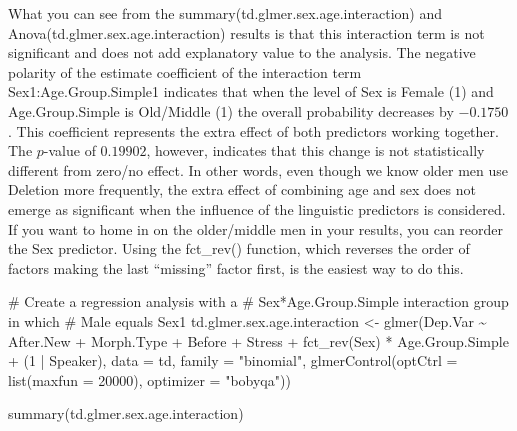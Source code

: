 \documentclass[
  10pt,
  letterpaper]{article}
\newenvironment{Shaded}{\begin{snugshade}}{\end{snugshade}}
\newcommand{\AttributeTok}[1]{\textcolor[rgb]{0.40,0.45,0.13}{#1}}
\newcommand{\CommentTok}[1]{\textcolor[rgb]{0.37,0.37,0.37}{#1}}
\newcommand{\DecValTok}[1]{\textcolor[rgb]{0.68,0.00,0.00}{#1}}
\newcommand{\FunctionTok}[1]{\textcolor[rgb]{0.28,0.35,0.67}{#1}}
\newcommand{\NormalTok}[1]{\textcolor[rgb]{0.00,0.23,0.31}{#1}}
\newcommand{\OtherTok}[1]{\textcolor[rgb]{0.00,0.23,0.31}{#1}}
\newcommand{\SpecialCharTok}[1]{\textcolor[rgb]{0.37,0.37,0.37}{#1}}
\newcommand{\StringTok}[1]{\textcolor[rgb]{0.13,0.47,0.30}{#1}}
\renewcommand\texttt[1]{{\ttfamily\color{BrickRed}#1}}
\begin{document}
What you can see from the \texttt{summary(td.glmer.sex.age.interaction)}
and \texttt{Anova(td.glmer.sex.age.interaction)} results is that this
interaction term is not significant and does not add explanatory value
to the analysis. The negative polarity of the estimate coefficient of
the interaction term \texttt{Sex1:Age.Group.Simple1} indicates that when
the level of \texttt{Sex} is \texttt{Female} (\texttt{1}) and
\texttt{Age.Group.Simple} is \texttt{Old/Middle} (\texttt{1}) the
overall probability decreases by \(-0.1750\). This coefficient
represents the extra effect of both predictors working together. The
\(p\)-value of \(0.19902\), however, indicates that this change is not
statistically different from zero/no effect. In other words, even though
we know older men use \texttt{Deletion} more frequently, the extra
effect of combining age and sex does not emerge as significant when the
influence of the linguistic predictors is considered. If you want to
home in on the older/middle men in your results, you can reorder the
\texttt{Sex} predictor. Using the \texttt{fct\_rev()} function, which
reverses the order of factors making the last ``missing'' factor first,
is the easiest way to do this.

\begin{Shaded}
\begin{Highlighting}[]
\CommentTok{\# Create a regression analysis with a}
\CommentTok{\# Sex*Age.Group.Simple interaction group in which}
\CommentTok{\# \textasciigrave{}Male\textasciigrave{} equals Sex1}
\NormalTok{td.glmer.sex.age.interaction }\OtherTok{\textless{}{-}} \FunctionTok{glmer}\NormalTok{(Dep.Var }\SpecialCharTok{\textasciitilde{}}\NormalTok{ After.New }\SpecialCharTok{+}
\NormalTok{    Morph.Type }\SpecialCharTok{+}\NormalTok{ Before }\SpecialCharTok{+}\NormalTok{ Stress }\SpecialCharTok{+} \FunctionTok{fct\_rev}\NormalTok{(Sex) }\SpecialCharTok{*}\NormalTok{ Age.Group.Simple }\SpecialCharTok{+}
\NormalTok{    (}\DecValTok{1} \SpecialCharTok{|}\NormalTok{ Speaker), }\AttributeTok{data =}\NormalTok{ td, }\AttributeTok{family =} \StringTok{"binomial"}\NormalTok{,}
    \FunctionTok{glmerControl}\NormalTok{(}\AttributeTok{optCtrl =} \FunctionTok{list}\NormalTok{(}\AttributeTok{maxfun =} \DecValTok{20000}\NormalTok{), }\AttributeTok{optimizer =} \StringTok{"bobyqa"}\NormalTok{))}

\FunctionTok{summary}\NormalTok{(td.glmer.sex.age.interaction)}
\end{Highlighting}
\end{Shaded}
\end{document}
